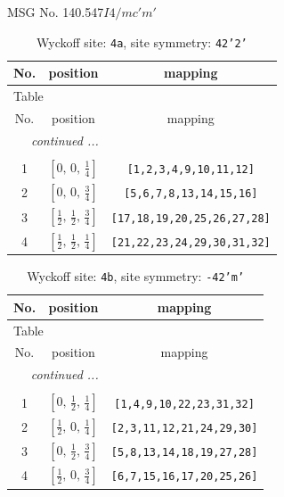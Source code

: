 \documentclass[fleqn,8pt]{jsarticle}
\begin{document}
\setcounter{MaxMatrixCols}{32}

\renewcommand{\tablename}{Table~}
\renewcommand{\figurename}{Figure~}
\begin{center}
\LARGE
MSG No. 140.547\quad$I4/mc'm'$
\end{center}
\renewcommand{\arraystretch}{1.2}
\begin{longtable}{ccc}
\caption{Wyckoff site: {\tt 4a}, site symmetry: {\tt 42'2'}}
 \\
 \hline \hline
No. & position & mapping \\ \hline \endfirsthead

\multicolumn{2}{l}{\tablename\ \thetable{}} \\
 \hline \hline
No. & position & mapping \\ \hline \endhead

 \hline \hline
\multicolumn{2}{r}{\footnotesize\it continued ...} \\ \endfoot

 \hline \hline
\multicolumn{2}{r}{} \\ \endlastfoot

1 & $\left[ 0,\, 0,\, \frac{1}{4} \right]$ & {\tt [1,2,3,4,9,10,11,12]} \\ \hline
2 & $\left[ 0,\, 0,\, \frac{3}{4} \right]$ & {\tt [5,6,7,8,13,14,15,16]} \\ \hline
3 & $\left[ \frac{1}{2},\, \frac{1}{2},\, \frac{3}{4} \right]$ & {\tt [17,18,19,20,25,26,27,28]} \\ \hline
4 & $\left[ \frac{1}{2},\, \frac{1}{2},\, \frac{1}{4} \right]$ & {\tt [21,22,23,24,29,30,31,32]} \\
\end{longtable}
\renewcommand{\arraystretch}{1.2}
\begin{longtable}{ccc}
\caption{Wyckoff site: {\tt 4b}, site symmetry: {\tt -42'm'}}
 \\
 \hline \hline
No. & position & mapping \\ \hline \endfirsthead

\multicolumn{2}{l}{\tablename\ \thetable{}} \\
 \hline \hline
No. & position & mapping \\ \hline \endhead

 \hline \hline
\multicolumn{2}{r}{\footnotesize\it continued ...} \\ \endfoot

 \hline \hline
\multicolumn{2}{r}{} \\ \endlastfoot

1 & $\left[ 0,\, \frac{1}{2},\, \frac{1}{4} \right]$ & {\tt [1,4,9,10,22,23,31,32]} \\ \hline
2 & $\left[ \frac{1}{2},\, 0,\, \frac{1}{4} \right]$ & {\tt [2,3,11,12,21,24,29,30]} \\ \hline
3 & $\left[ 0,\, \frac{1}{2},\, \frac{3}{4} \right]$ & {\tt [5,8,13,14,18,19,27,28]} \\ \hline
4 & $\left[ \frac{1}{2},\, 0,\, \frac{3}{4} \right]$ & {\tt [6,7,15,16,17,20,25,26]} \\
\end{longtable}
\end{document}
